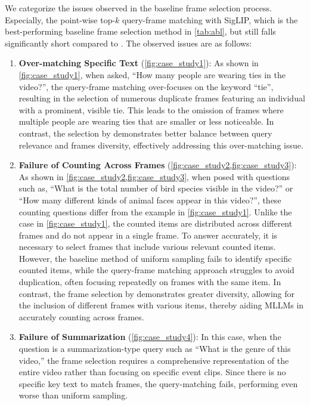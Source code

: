 We categorize the issues observed in the baseline frame selection process.
Especially, the point-wise top-$k$ query-frame matching with SigLIP, which is the best-performing baseline frame selection method in \cref{tab:abl}, but still falls significantly short compared to \mname{}. 
The observed issues are as follows:
\begin{enumerate}
    \item \textbf{Over-matching Specific Text} (\cref{fig:case_study1}):
    	As shown in \cref{fig:case_study1}, when asked, ``How many people are wearing ties in the video?'', the query-frame matching over-focuses on the keyword ``tie'', 
    	resulting in the selection of numerous duplicate frames featuring an individual with a prominent, visible tie.
    	This leads to the omission of frames where multiple people are wearing ties that are smaller or less noticeable.
    	In contrast, the selection by \mname{} demonstrates better balance between query relevance and frames diversity, effectively addressing this over-matching issue.
	\item \textbf{Failure of Counting Across Frames} (\cref{fig:case_study2,fig:case_study3}): 
		As shown in \cref{fig:case_study2,fig:case_study3}, when posed with questions such as, ``What is the total number of bird species visible in the video?'' or ``How many different kinds of animal faces appear in this video?'', these counting questions differ from the example in \cref{fig:case_study1}.
		Unlike the case in \cref{fig:case_study1}, the counted items are distributed across different frames and do not appear in a single frame.
		To answer accurately, it is necessary to select frames that include various relevant counted items.
		However, the baseline method of uniform sampling fails to identify specific counted items, while the query-frame matching approach struggles to avoid duplication, often focusing repeatedly on frames with the same item.
		In contrast, the frame selection by \mname{} demonstrates greater diversity, allowing for the inclusion of different frames with various items, thereby aiding MLLMs in accurately counting across frames.
	\item \textbf{Failure of Summarization} (\cref{fig:case_study4}):
		In this case, when the question is a summarization-type query such as ``What is the genre of this video,'' the frame selection requires a comprehensive representation of the entire video rather than focusing on specific event clips.
		Since there is no specific key text to match frames, the query-matching fails, performing even worse than uniform sampling.

\end{enumerate}
